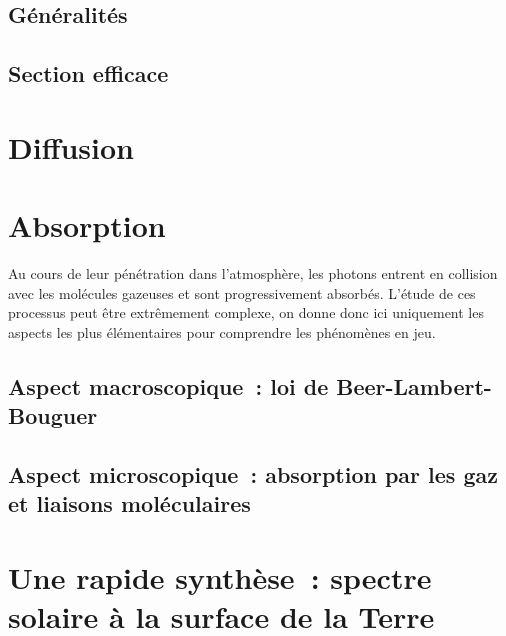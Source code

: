 	\sk \subsection{Généralités}

		

	\sk \subsection{Section efficace}\label{sec:efficace}

		

\mk \section{Diffusion}

	


\mk \section{Absorption} Au cours de leur pénétration dans l'atmosphère, les photons entrent en collision avec les molécules gazeuses et sont progressivement absorbés. L'étude de ces processus peut être extrêmement complexe, on donne donc ici uniquement les aspects les plus élémentaires pour comprendre les phénomènes en jeu.

	\sk \subsection{Aspect macroscopique~: loi de Beer-Lambert-Bouguer}
	
		

	\sk \subsection{Aspect microscopique~: absorption par les gaz et liaisons moléculaires}

		

		



\mk
\section{Une rapide synthèse~: spectre solaire à la surface de la Terre}

